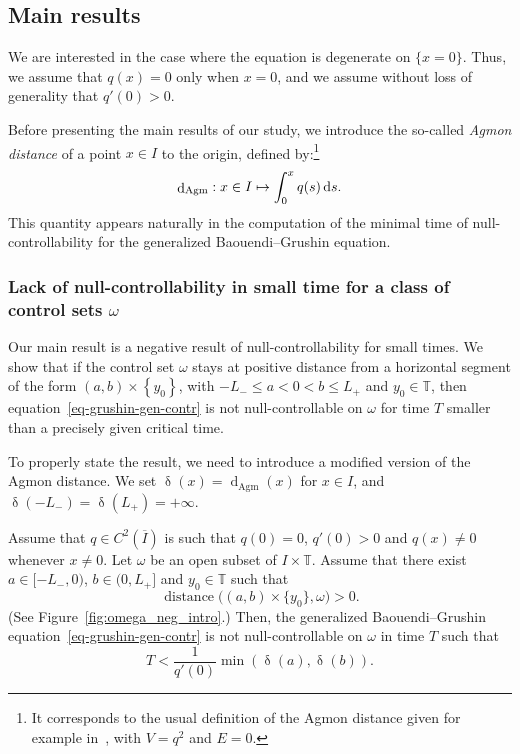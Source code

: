 \documentclass[AHL,Unicode,longabstracts,published]{cedram}
\renewcommand{\leq}{\leqslant}
\newcommand{\1}{\mathds 1}
\DeclareMathOperator{\distance}{distance}
\newcommand{\dagmon}{\mathop{\mathrm{d}}\nolimits_{\mathrm{Agm}}}
\DeclareMathOperator{\dagmontilde}{\delta}
\newcommand{\T}{\mathbb{T}}
\newcommand{\diff}[1][-3]{\ensuremath{\mathop{}\mkern#1mu\mathrm{d}}}
\renewcommand{\o}{\omega}
\renewcommand{\o}{\omega}
\begin{document}
\subsection{Main results}

We are interested in the case where the equation is degenerate on $\{x=0\}$. Thus, we assume that $q(x) = 0$ only when $x=0$, and we assume without loss of generality that $q'(0) > 0$.

Before presenting the main results of our study, we introduce the so-called \emph{Agmon distance} of a point $x \in I$ to the origin, defined by:\footnote{It corresponds to the usual definition of the Agmon distance given for example in~\cite[Eq.~(6.3)]{DS99}, with $V = q^2$ and $E = 0$.}
\begin{equation}\label{eq-def-agmon}
\dagmon : x\in I \mapsto \int_0^x q(s)\diff s.
\end{equation}
This quantity appears naturally in the computation of the minimal time of null-controllability for the generalized Baouendi--Grushin equation.

\subsubsection{Lack of null-controllability in small time for a class of control sets $\o$}

Our main result is a negative result of null-controllability for small times. We show that if the control set $\o$ stays at positive distance from a horizontal segment of the form $(a,b)\times \left\lbrace y_0 \right\rbrace$, with $-L_-\leq a<0<b\leq L_+$ and $y_0 \in \T$, then equation~\eqref{eq-grushin-gen-contr} is not null-controllable on $\o$ for time $T$ smaller than a precisely given critical time.

To properly state the result, we need to introduce a modified version of the Agmon distance. We set $\dagmontilde(x) = \dagmon(x)$ for $x \in I$, and $\dagmontilde(-L_-) = \dagmontilde(L_+) = +\infty$.



\begin{theo}\label{th-main-neg-intro}
Assume that $q\in C^2(\overline I)$ is such that $q(0) = 0$, $q'(0) > 0$ and $q(x) \neq 0$ whenever $x\neq 0$. Let $\o$ be an open subset of $I\times \T$. Assume that there exist $a \in [-L_-,0)$, $b \in (0,L_+]$ and $y_0 \in \T$ such that
\[
\distance\big((a,b)\times \{y_0\}, \o\big) > 0.
\]
(See Figure~\ref{fig:omega_neg_intro}.) Then, the generalized Baouendi--Grushin equation~\eqref{eq-grushin-gen-contr} is not null-controllable on $\o$ in time $T$ such that
\[
T< \frac{1}{q'(0)}\min \left(\dagmontilde(a),\dagmontilde(b) \right).
\]
\end{theo}
\end{document}
